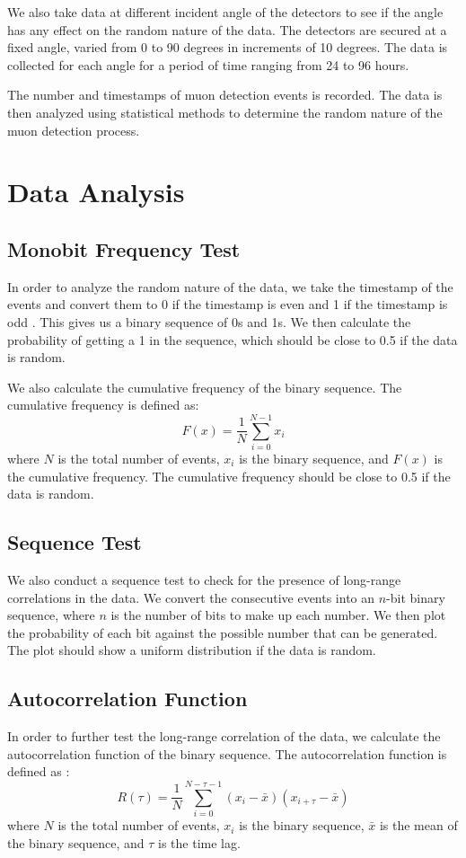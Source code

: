 We also take data at different incident angle of the detectors to see if the angle has any effect on the random nature of the data. The detectors are secured at a fixed angle, varied from 0 to 90 degrees in increments of 10 degrees. The data is collected for each angle for a period of time ranging from 24 to 96 hours. 

The number and timestamps of muon detection events is recorded. The data is then analyzed using statistical methods to determine the random nature of the muon detection process.

\section{Data Analysis}

\subsection{Monobit Frequency Test}
In order to analyze the random nature of the data, we take the timestamp of the events and convert them to 0 if the timestamp is even and 1 if the timestamp is odd \cite{axani2024cosmicwatch}. This gives us a binary sequence of 0s and 1s. We then calculate the probability of getting a 1 in the sequence, which should be close to 0.5 if the data is random. 

We also calculate the cumulative frequency of the binary sequence. The cumulative frequency is defined as:
\begin{equation}
F(x) = \frac{1}{N} \sum_{i=0}^{N-1} x_i
\end{equation}
where $N$ is the total number of events, $x_i$ is the binary sequence, and $F(x)$ is the cumulative frequency. The cumulative frequency should be close to 0.5 if the data is random.

\subsection{Sequence Test}
We also conduct a sequence test to check for the presence of long-range correlations in the data. We convert the consecutive events into an $n$-bit binary sequence, where $n$ is the number of bits to make up each number. We then plot the probability of each bit against the possible number that can be generated. The plot should show a uniform distribution if the data is random. 

\subsection{Autocorrelation Function}
In order to further test the long-range correlation of the data, we calculate the autocorrelation function of the binary sequence. The autocorrelation function is defined as \cite{brockwell1991timeseries}:
\begin{equation}
R(\tau) = \frac{1}{N} \sum_{i=0}^{N-\tau-1} (x_i - \bar{x})(x_{i+\tau} - \bar{x})
\end{equation}
where $N$ is the total number of events, $x_i$ is the binary sequence, $\bar{x}$ is the mean of the binary sequence, and $\tau$ is the time lag. 

